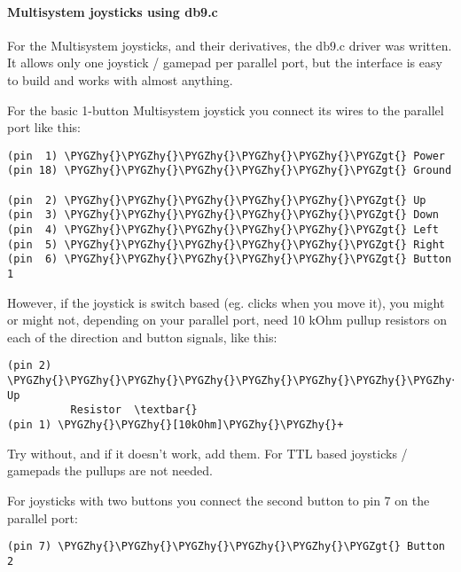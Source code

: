 \documentclass[a4paper,8pt,english]{sphinxmanual}
\def\PYGZgt{\char`\>}
\def\PYGZhy{\char`\-}
\begin{document}
\paragraph{Multisystem joysticks using db9.c}
\label{input/devices/joystick-parport:multisystem-joysticks-using-db9-c}
For the Multisystem joysticks, and their derivatives, the db9.c driver
was written. It allows only one joystick / gamepad per parallel port, but
the interface is easy to build and works with almost anything.

For the basic 1-button Multisystem joystick you connect its wires to the
parallel port like this:

\begin{Verbatim}[commandchars=\\\{\}]
(pin  1) \PYGZhy{}\PYGZhy{}\PYGZhy{}\PYGZhy{}\PYGZhy{}\PYGZgt{} Power
(pin 18) \PYGZhy{}\PYGZhy{}\PYGZhy{}\PYGZhy{}\PYGZhy{}\PYGZgt{} Ground

(pin  2) \PYGZhy{}\PYGZhy{}\PYGZhy{}\PYGZhy{}\PYGZhy{}\PYGZgt{} Up
(pin  3) \PYGZhy{}\PYGZhy{}\PYGZhy{}\PYGZhy{}\PYGZhy{}\PYGZgt{} Down
(pin  4) \PYGZhy{}\PYGZhy{}\PYGZhy{}\PYGZhy{}\PYGZhy{}\PYGZgt{} Left
(pin  5) \PYGZhy{}\PYGZhy{}\PYGZhy{}\PYGZhy{}\PYGZhy{}\PYGZgt{} Right
(pin  6) \PYGZhy{}\PYGZhy{}\PYGZhy{}\PYGZhy{}\PYGZhy{}\PYGZgt{} Button 1
\end{Verbatim}

However, if the joystick is switch based (eg. clicks when you move it),
you might or might not, depending on your parallel port, need 10 kOhm pullup
resistors on each of the direction and button signals, like this:

\begin{Verbatim}[commandchars=\\\{\}]
(pin 2) \PYGZhy{}\PYGZhy{}\PYGZhy{}\PYGZhy{}\PYGZhy{}\PYGZhy{}\PYGZhy{}\PYGZhy{}\PYGZhy{}\PYGZhy{}\PYGZhy{}\PYGZhy{}+\PYGZhy{}\PYGZhy{}\PYGZhy{}\PYGZhy{}\PYGZhy{}\PYGZhy{}\PYGZgt{} Up
          Resistor  \textbar{}
(pin 1) \PYGZhy{}\PYGZhy{}[10kOhm]\PYGZhy{}\PYGZhy{}+
\end{Verbatim}

Try without, and if it doesn't work, add them. For TTL based joysticks /
gamepads the pullups are not needed.

For joysticks with two buttons you connect the second button to pin 7 on
the parallel port:

\begin{Verbatim}[commandchars=\\\{\}]
(pin 7) \PYGZhy{}\PYGZhy{}\PYGZhy{}\PYGZhy{}\PYGZhy{}\PYGZgt{} Button 2
\end{Verbatim}
\end{document}
